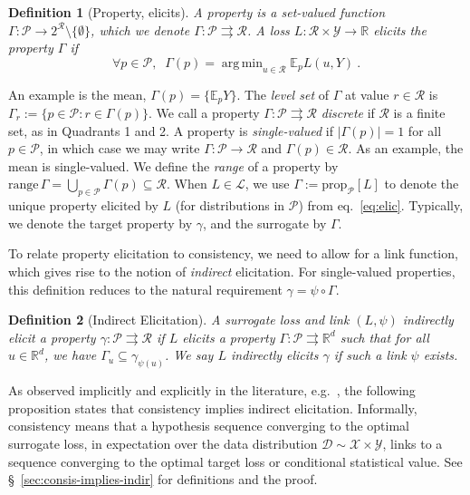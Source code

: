 \documentclass[11pt]{article} %
\newcommand{\Comments}{1}
\newcommand{\mytodo}[2]{\ifnum\Comments=1%
	\todo[linecolor=#1!80!black,backgroundcolor=#1,bordercolor=#1!80!black]{#2}\fi}
\newcommand{\btw}[1]{}%
\newcommand{\reals}{\mathbb{R}}
\newcommand{\prop}[2][\mathcal{P}]{\mathrm{prop}_{#1}[#2]}
\newcommand{\range}{\mathrm{range}\,}
\newcommand{\D}{\mathcal{D}}
\newcommand{\E}{\mathbb{E}}
\renewcommand{\L}{\mathcal{L}}
\newcommand{\R}{\mathcal{R}}
\renewcommand{\P}{\mathcal{P}}
\newcommand{\X}{\mathcal{X}}
\newcommand{\Y}{\mathcal{Y}}
\newcommand{\exploss}[3]{\E_{#3} #1(#2,Y)}
\newcommand{\toto}{\rightrightarrows}
\newtheorem{definition}{Definition}
\DeclareMathOperator*{\argmin}{arg\,min}
\begin{document}
\begin{definition}[Property, elicits]
	A \emph{property} is a set-valued function $\Gamma : \P \to 2^\R \setminus \{\emptyset\}$, which we denote $\Gamma: \P \toto \R$.
	A loss $L : \R \times \Y \to \reals$ \emph{elicits} the property $\Gamma$ if
	\begin{equation}
    \label{eq:elic}    
    \forall p \in \P, \;\; \Gamma(p) = \argmin_{u \in \R} \exploss{L}{u}{p}~.
	\end{equation}
\end{definition}
An example is the mean, $\Gamma(p) = \{\E_p Y\}$.
The \emph{level set} of $\Gamma$ at value $r\in\R$ is $\Gamma_r := \{p \in \P : r \in \Gamma(p)\}$.
We call a property $\Gamma: \P \toto \R$ \emph{discrete} if $\R$ is a finite set, as in Quadrants 1 and 2.
A property is \emph{single-valued} if $|\Gamma(p)|=1$ for all $p\in\P$, in which case we may write $\Gamma:\P\to\R$ and $\Gamma(p) \in \R$.
As an example, the mean is single-valued.
We define the \emph{range} of a property by $\range \Gamma = \bigcup_{p\in\P} \Gamma(p) \subseteq \R$.
When $L\in\L$, we use $\Gamma := \prop[\P]{L}$ to denote the unique property elicited by $L$ (for distributions in $\P$) from eq.~\eqref{eq:elic}. 
Typically, we denote the target property by $\gamma$, and the surrogate by $\Gamma$.

To relate property elicitation to consistency, we need to allow for a link function, which gives rise to the notion of \emph{indirect} elicitation.
For single-valued properties, this definition reduces to the natural requirement $\gamma = \psi \circ \Gamma$.
\begin{definition}[Indirect Elicitation]\label{def:indirectly-elicits}
	A surrogate loss and link $(L, \psi)$ \emph{indirectly elicit} a property $\gamma:\P \toto \R$ if $L$ elicits a property $\Gamma: \P \toto \reals^d$ such that for all $u \in \reals^d$, we have $\Gamma_u \subseteq \gamma_{\psi(u)}$.
	We say $L$ \emph{indirectly elicits} $\gamma$ if such a link $\psi$ exists.
  \btw{interesting discussion of set-valued properties commented out; revive later!}
\end{definition}

As observed implicitly and explicitly in the literature, e.g.~\citep{steinwart2008support,agarwal2015consistent}, the following proposition states that consistency implies indirect elicitation.
Informally, consistency means that a hypothesis sequence converging to the optimal surrogate loss, in expectation over the data distribution $\D \sim \X \times \Y$, links to a sequence converging to the optimal target loss or conditional statistical value.
See \S~\ref{sec:consis-implies-indir} for definitions and the proof.
\end{document}
